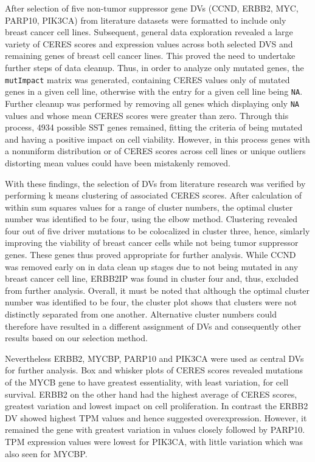 \documentclass[]{article}
\begin{document}
After selection of five non-tumor suppressor gene DVs (CCND, ERBB2, MYC,
PARP10, PIK3CA) from literature datasets were formatted to include only
breast cancer cell lines. Subsequent, general data exploration revealed
a large variety of CERES scores and expression values across both
selected DVS and remaining genes of breast cell cancer lines. This
proved the need to undertake further steps of data cleanup. Thus, in
order to analyze only mutated genes, the \texttt{mutImpact} matrix was
generated, containing CERES values only of mutated genes in a given cell
line, otherwise with the entry for a given cell line being \texttt{NA}.
Further cleanup was performed by removing all genes which displaying
only \texttt{NA} values and whose mean CERES scores were greater than
zero. Through this process, 4934 possible SST genes remained, fitting
the criteria of being mutated and having a positive impact on cell
viability. However, in this process genes with a nonuniform distribution
or of CERES scores across cell lines or unique outliers distorting mean
values could have been mistakenly removed.

With these findings, the selection of DVs from literature research was
verified by performing k means clustering of associated CERES scores.
After calculation of within sum squares values for a range of cluster
numbers, the optimal cluster number was identified to be four, using the
elbow method. Clustering revealed four out of five driver mutations to
be colocalized in cluster three, hence, simlarly improving the viability
of breast cancer cells while not being tumor suppressor genes. These
genes thus proved appropriate for further analysis. While CCND was
removed early on in data clean up stages due to not being mutated in any
breast cancer cell line, ERBB2IP was found in cluster four and, thus,
excluded from further analysis. Overall, it must be noted that although
the optimal cluster number was identified to be four, the cluster plot
shows that clusters were not distinctly separated from one another.
Alternative cluster numbers could therefore have resulted in a different
assignment of DVs and consequently other results based on our selection
method.

Nevertheless ERBB2, MYCBP, PARP10 and PIK3CA were used as central DVs
for further analysis. Box and whisker plots of CERES scores revealed
mutations of the MYCB gene to have greatest essentiality, with least
variation, for cell survival. ERBB2 on the other hand had the highest
average of CERES scores, greatest variation and lowest impact on cell
proliferation. In contrast the ERBB2 DV showed highest TPM values and
hence suggested overexpression. However, it remained the gene with
greatest variation in values closely followed by PARP10. TPM expression
values were lowest for PIK3CA, with little variation which was also seen
for MYCBP.
\end{document}
